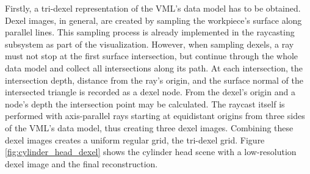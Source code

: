 Firstly, a tri-dexel representation of the VML's data model has to be obtained.
Dexel images, in general, are created by sampling the workpiece's surface along parallel lines.
This sampling process is already implemented in the raycasting subsystem as part of the visualization.
However, when sampling dexels, a ray must not stop at the first surface intersection, but continue through the whole data model and collect all intersections along its path.
At each intersection, the intersection depth, \ie distance from the ray's origin, and the surface normal of the intersected triangle is recorded as a dexel node.
From the dexel's origin and a node's depth the intersection point may be calculated.
The raycast itself is performed with axis-parallel rays starting at equidistant origins from three sides of the VML's data model, thus creating three dexel images.
Combining these dexel images creates a uniform regular grid, the tri-dexel grid.
Figure \ref{fig:cylinder_head_dexel} shows the cylinder head scene with a low-resolution dexel image and the final reconstruction.

